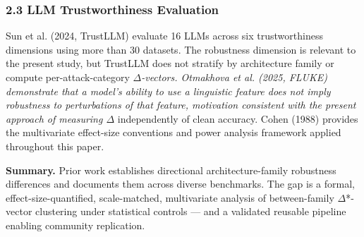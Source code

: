 \subsubsection{2.3 LLM Trustworthiness Evaluation}

Sun et al. (2024, TrustLLM) evaluate 16 LLMs across six trustworthiness dimensions using more than 30 datasets. The robustness dimension is relevant to the present study, but TrustLLM does not stratify by architecture family or compute per-attack-category $\Delta$\textit{-vectors. Otmakhova et al. (2025, FLUKE) demonstrate that a model's ability to use a linguistic feature does not imply robustness to perturbations of that feature, motivation consistent with the present approach of measuring $\Delta$} independently of clean accuracy. Cohen (1988) provides the multivariate effect-size conventions and power analysis framework applied throughout this paper.

\textbf{Summary.} Prior work establishes directional architecture-family robustness differences and documents them across diverse benchmarks. The gap is a formal, effect-size-quantified, scale-matched, multivariate analysis of between-family $\Delta$*-vector clustering under statistical controls --- and a validated reusable pipeline enabling community replication.

